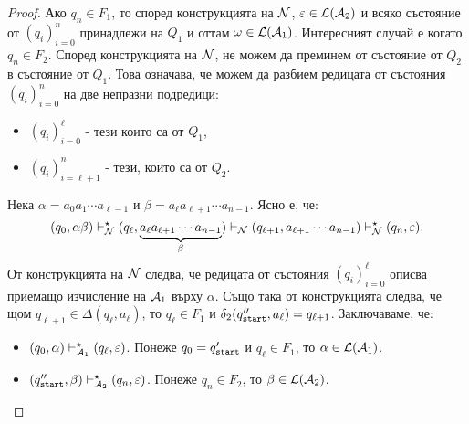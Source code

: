 \begin{proof}
  Ако $q_n \in F_1$, то според конструкцията на $\mathcal{N}$, $\varepsilon \in \mathcal{L}(\mathcal{A}_2)$ и всяко състояние от $(q_i)^{n}_{i=0}$ принадлежи на $Q_1$ и оттам $\omega \in \mathcal{L}(\mathcal{A}_1)$.
  Интересният случай е когато $q_n \in F_2$.
  Според конструкцията на $\mathcal{N}$, не можем да преминем от състояние от $Q_2$ в състояние от $Q_1$.
  Това означава, че можем да разбием редицата от състояния $(q_i)^n_{i=0}$ на две непразни подредици:
  \begin{itemize}
  \item
    $(q_{i})^{\ell}_{i=0}$ - тези които са от $Q_1$,
  \item
    $(q_i)^{n}_{i=\ell+1}$ - тези, които са от $Q_2$.
  \end{itemize}
  Нека $\alpha = a_0a_1\cdots a_{\ell-1}$ и $\beta = a_{\ell}a_{\ell+1}\cdots a_{n-1}$.
  Ясно е, че:
  \[(q_0,\alpha\beta) \vdash^\star_{\mathcal{N}} (q_{\ell}, \underbrace{a_{\ell}a_{\ell+1}\cdots a_{n-1}}_{\beta}) \vdash_{\mathcal{N}} (q_{\ell+1},a_{\ell+1}\cdots a_{n-1}) \vdash^\star_{\mathcal{N}} (q_n,\varepsilon).\]
  От конструкцията на $\mathcal{N}$ следва, че редицата от състояния $(q_i)^{\ell}_{i=0}$ описва приемащо изчисление на $\mathcal{A}_1$ върху $\alpha$.
  Също така от конструкцията следва, че щом $q_{\ell+1} \in \Delta(q_\ell,a_\ell)$, то $q_{\ell} \in F_1$ и $\delta_2(q_{\texttt{start}}'',a_\ell) = q_{\ell+1}$. Заключаваме, че:
  \begin{itemize}
  \item
    $(q_0, \alpha) \vdash^\star_{\mathcal{A}_1} (q_\ell,\varepsilon)$.
    Понеже $q_0 = q_{\texttt{start}}'$ и $q_\ell \in F_1$, то $\alpha \in \mathcal{L}(\mathcal{A}_1)$.
  \item
    $(q_{\texttt{start}}'', \beta) \vdash^\star_{\mathcal{A}_2} (q_n,\varepsilon)$.
    Понеже $q_n \in F_2$, то $\beta \in \mathcal{L}(\mathcal{A}_2)$.
  \end{itemize}
\end{proof}

